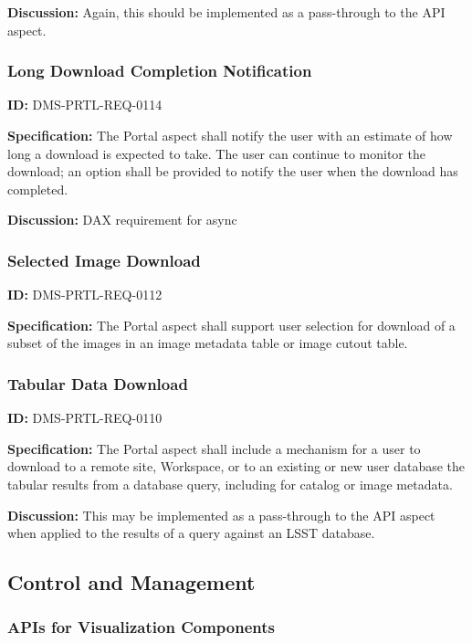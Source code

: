 \documentclass[SE,toc,lsstdraft]{lsstdoc}
\begin{document}
\textbf{Discussion:}
Again, this should be implemented as a pass-through to the API aspect.

\subsubsection{Long Download Completion Notification}

\label{DMS-PRTL-REQ-0114}
\textbf{ID:} DMS-PRTL-REQ-0114

\textbf{Specification:}
The Portal aspect shall notify the user with an estimate of how long a download is expected to take. The user can continue to monitor the download; an option shall be provided to notify the user when the download has completed.

\textbf{Discussion:}
DAX requirement for async

\subsubsection{Selected Image Download}

\label{DMS-PRTL-REQ-0112}
\textbf{ID:} DMS-PRTL-REQ-0112

\textbf{Specification:}
The Portal aspect shall support user selection for download of a subset of the images in an image metadata table or image cutout table.

\subsubsection{Tabular Data Download}

\label{DMS-PRTL-REQ-0110}
\textbf{ID:} DMS-PRTL-REQ-0110

\textbf{Specification:}
The Portal aspect shall include a mechanism for a user to download to a remote site, Workspace, or to an existing or new user database the tabular results from a database query, including for catalog or image metadata.

\textbf{Discussion:}
This may be implemented as a pass-through to the API aspect when applied to the results of a query against an LSST database.

\subsection{Control and Management}

\subsubsection{APIs for Visualization Components}
\end{document}
